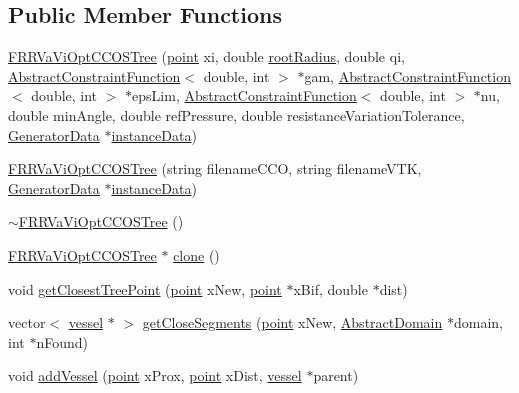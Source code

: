 \subsection*{Public Member Functions}
\begin{DoxyCompactItemize}
\item 
\hyperlink{class_f_r_r_va_vi_opt_c_c_o_s_tree_ae9de8306c3492b1b59df21e1aa39a2ec}{F\+R\+R\+Va\+Vi\+Opt\+C\+C\+O\+S\+Tree} (\hyperlink{structpoint}{point} xi, double \hyperlink{class_f_r_r_va_vi_opt_c_c_o_s_tree_a459526bb36610ba6131cdfd788f9025b}{root\+Radius}, double qi, \hyperlink{class_abstract_constraint_function}{Abstract\+Constraint\+Function}$<$ double, int $>$ $\ast$gam, \hyperlink{class_abstract_constraint_function}{Abstract\+Constraint\+Function}$<$ double, int $>$ $\ast$eps\+Lim, \hyperlink{class_abstract_constraint_function}{Abstract\+Constraint\+Function}$<$ double, int $>$ $\ast$nu, double min\+Angle, double ref\+Pressure, double resistance\+Variation\+Tolerance, \hyperlink{class_generator_data}{Generator\+Data} $\ast$\hyperlink{class_abstract_structured_c_c_o_tree_af1836d7ed2156f3cf9cc311edfdc49b1}{instance\+Data})
\item 
\hyperlink{class_f_r_r_va_vi_opt_c_c_o_s_tree_acb93586a162c23493347db65deae06df}{F\+R\+R\+Va\+Vi\+Opt\+C\+C\+O\+S\+Tree} (string filename\+C\+CO, string filename\+V\+TK, \hyperlink{class_generator_data}{Generator\+Data} $\ast$\hyperlink{class_abstract_structured_c_c_o_tree_af1836d7ed2156f3cf9cc311edfdc49b1}{instance\+Data})
\item 
\hyperlink{class_f_r_r_va_vi_opt_c_c_o_s_tree_a50692a5fade1f64055872e81705198e5}{$\sim$\+F\+R\+R\+Va\+Vi\+Opt\+C\+C\+O\+S\+Tree} ()
\item 
\hyperlink{class_f_r_r_va_vi_opt_c_c_o_s_tree}{F\+R\+R\+Va\+Vi\+Opt\+C\+C\+O\+S\+Tree} $\ast$ \hyperlink{class_f_r_r_va_vi_opt_c_c_o_s_tree_acddc90c3f029e2c3f359e4529aa0fc3b}{clone} ()
\item 
void \hyperlink{class_f_r_r_va_vi_opt_c_c_o_s_tree_a8360ecbbf60ee0e52d4a83f40a3f0154}{get\+Closest\+Tree\+Point} (\hyperlink{structpoint}{point} x\+New, \hyperlink{structpoint}{point} $\ast$x\+Bif, double $\ast$dist)
\item 
vector$<$ \hyperlink{structvessel}{vessel} $\ast$ $>$ \hyperlink{class_f_r_r_va_vi_opt_c_c_o_s_tree_a88826c9f37705bcce03374d920eff19a}{get\+Close\+Segments} (\hyperlink{structpoint}{point} x\+New, \hyperlink{class_abstract_domain}{Abstract\+Domain} $\ast$domain, int $\ast$n\+Found)
\item 
void \hyperlink{class_f_r_r_va_vi_opt_c_c_o_s_tree_a95c4523a6c2ed20c16d83b62ec6b5873}{add\+Vessel} (\hyperlink{structpoint}{point} x\+Prox, \hyperlink{structpoint}{point} x\+Dist, \hyperlink{structvessel}{vessel} $\ast$parent)

\end{DoxyCompactItemize}
